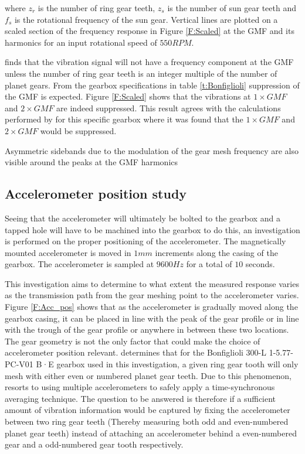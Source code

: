 where $z_{r}$ is the number of ring gear teeth, $z_{s}$ is the number of sun gear teeth and $f_{s}$ is the rotational frequency of the sun gear. Vertical lines are plotted on a scaled section of the frequency response in Figure \ref{F:Scaled} at the GMF and its harmonics for an input rotational speed of $550 RPM$. 

\cite{McNames2002} finds that the vibration signal will not have a frequency component at the GMF unless the number of ring gear teeth is an integer multiple of the number of planet gears. From the gearbox specifications in table \ref{t:Bonfiglioli} suppression of the GMF is expected. Figure \ref{F:Scaled} shows that the vibrations at $1\times GMF$ and $2 \times GMF$ are indeed suppressed. This result agrees with the calculations performed by \cite{Smidt2009} for this specific gearbox where it was found that the $1 \times GMF$ and $2 \times GMF$ would be suppressed.

Asymmetric sidebands due to  the modulation of the gear mesh frequency are also visible around the peaks at the GMF harmonics 

\subsection{Accelerometer position study}
Seeing that the accelerometer will ultimately be bolted to the gearbox and a tapped hole will have to be machined into the gearbox to do this, an investigation is performed on the proper positioning of the accelerometer. The magnetically mounted accelerometer is moved in $1mm$ increments along the casing of the gearbox. The accelerometer is sampled at $9600Hz$ for a total of $10$ seconds. 

This investigation aims to determine to what extent the measured response varies as the transmission path from the gear meshing point to the accelerometer varies. Figure \ref{F:Acc_pos} shows that as the accelerometer is gradually moved along the gearbox casing, it can be placed in line with the peak of the gear profile or in line with the trough of the gear profile or anywhere in between these two locations. The gear geometry is not the only factor that could make the choice of accelerometer position relevant.\cite{Smidt2009} determines that for the Bonfiglioli 300-L 1-5.77-PC-V01 B·E  gearbox used in this investigation, a given ring gear tooth will only mesh with either even or numbered planet gear teeth. Due to this phenomenon, \cite{Smidt2009} resorts to using multiple accelerometers to safely apply a time-synchronous averaging technique. The question to be answered is therefore if a sufficient amount of vibration information would be captured by fixing the accelerometer between two ring gear teeth (Thereby measuring both odd and even-numbered planet gear teeth) instead of attaching an accelerometer behind a even-numbered gear and a odd-numbered gear tooth respectively.

